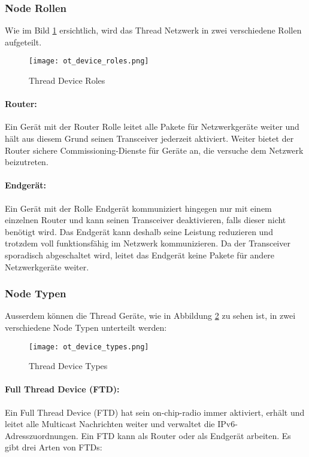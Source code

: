 \subsubsection{Node Rollen}\label{subsubsec:NodeRollen}
Wie im Bild \ref{fig:ThreadDeviceRoles} ersichtlich, wird das Thread Netzwerk in zwei verschiedene Rollen aufgeteilt. \cite[Seite 1-4]{thread_group_inc_thread_2017}

\begin{figure}[H]
	\centering
	\texttt{[image: ot\_device\_roles.png]}
	\caption{Thread Device Roles}\label{fig:ThreadDeviceRoles}
\end{figure}

\paragraph{Router:}
Ein Gerät mit der Router Rolle leitet alle Pakete für Netzwerkgeräte weiter und hält aus diesem Grund seinen Transceiver jederzeit aktiviert. Weiter bietet der Router sichere Commissioning-Dienste für Geräte an, die versuche dem Netzwerk beizutreten. \cite[Seite 1-4]{thread_group_inc_thread_2017}

\paragraph{Endgerät:}
Ein Gerät mit der Rolle Endgerät kommuniziert hingegen nur mit einem einzelnen Router und kann seinen Transceiver deaktivieren, falls dieser nicht benötigt wird. Das Endgerät kann deshalb seine Leistung reduzieren und trotzdem voll funktionsfähig im Netzwerk kommunizieren. Da der Transceiver sporadisch abgeschaltet wird, leitet das Endgerät keine Pakete für andere Netzwerkgeräte weiter. \cite[Seite 1-4]{thread_group_inc_thread_2017}

\newpage
\subsubsection{Node Typen}\label{subsubsec:NodeTypen}
Ausserdem können die Thread Geräte, wie in Abbildung \ref{fig:ThreadDeviceTypes} zu sehen ist, in zwei verschiedene Node Typen unterteilt werden: \cite[Seite 1-4]{thread_group_inc_thread_2017}
\begin{figure}[H]
	\centering
	\texttt{[image: ot\_device\_types.png]}
	\caption{Thread Device Types}\label{fig:ThreadDeviceTypes}
\end{figure}

\paragraph{Full Thread Device (FTD):}\label{par:FullThreadDevice}
Ein Full Thread Device (FTD) hat sein on-chip-radio immer aktiviert, erhält und leitet alle Multicast Nachrichten weiter und verwaltet die IPv6-Adresszuordnungen. Ein FTD kann als Router oder als Endgerät arbeiten. Es gibt drei Arten von FTDs: \cite[Seite 1-4]{thread_group_inc_thread_2017}

